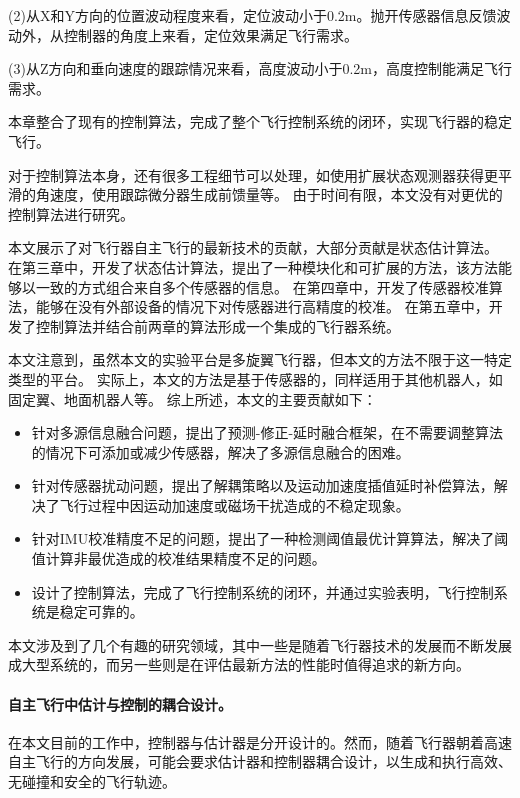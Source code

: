 \documentclass[
  type=master
]{gdutthesis}
\begin{document}
(2)从X和Y方向的位置波动程度来看，定位波动小于0.2m。抛开传感器信息反馈波动外，从控制器的角度上来看，定位效果满足飞行需求。

(3)从Z方向和垂向速度的跟踪情况来看，高度波动小于0.2m，高度控制能满足飞行需求。

本章整合了现有的控制算法，完成了整个飞行控制系统的闭环，实现飞行器的稳定飞行。

对于控制算法本身，还有很多工程细节可以处理，如使用扩展状态观测器获得更平滑的角速度，使用跟踪微分器生成前馈量等。
由于时间有限，本文没有对更优的控制算法进行研究。

\gdutbackmatter
{}
本文展示了对飞行器自主飞行的最新技术的贡献，大部分贡献是状态估计算法。
在第三章中，开发了状态估计算法，提出了一种模块化和可扩展的方法，该方法能够以一致的方式组合来自多个传感器的信息。
在第四章中，开发了传感器校准算法，能够在没有外部设备的情况下对传感器进行高精度的校准。
在第五章中，开发了控制算法并结合前两章的算法形成一个集成的飞行器系统。

本文注意到，虽然本文的实验平台是多旋翼飞行器，但本文的方法不限于这一特定类型的平台。
实际上，本文的方法是基于传感器的，同样适用于其他机器人，如固定翼、地面机器人等。
综上所述，本文的主要贡献如下：
\begin{itemize}
	\item 针对多源信息融合问题，提出了预测-修正-延时融合框架，在不需要调整算法的情况下可添加或减少传感器，解决了多源信息融合的困难。
	\item 针对传感器扰动问题，提出了解耦策略以及运动加速度插值延时补偿算法，解决了飞行过程中因运动加速度或磁场干扰造成的不稳定现象。
	\item 针对IMU校准精度不足的问题，提出了一种检测阈值最优计算算法，解决了阈值计算非最优造成的校准结果精度不足的问题。
	\item 设计了控制算法，完成了飞行控制系统的闭环，并通过实验表明，飞行控制系统是稳定可靠的。
\end{itemize}

本文涉及到了几个有趣的研究领域，其中一些是随着飞行器技术的发展而不断发展成大型系统的，而另一些则是在评估最新方法的性能时值得追求的新方向。
\paragraph{自主飞行中估计与控制的耦合设计。}
在本文目前的工作中，控制器与估计器是分开设计的。然而，随着飞行器朝着高速自主飞行的方向发展，可能会要求估计器和控制器耦合设计，以生成和执行高效、无碰撞和安全的飞行轨迹。
\end{document}
